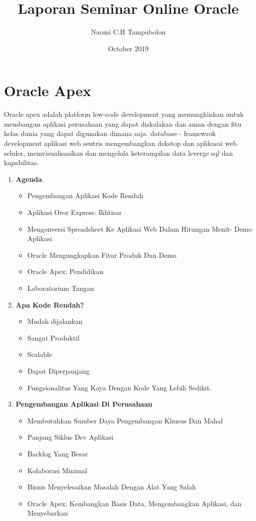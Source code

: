 \documentclass{article}
\title{Laporan Seminar Online Oracle}
\author{Naomi C.H Tampubolon }
\date{October 2019}
\begin{document}
\maketitle

\section{Oracle Apex}
Oracle apex adalah platform low-code development yang memungkinkan untuk membangun aplikasi perusahaan yang dapat diskalakan dan aman dengan fitu kelas dunia yang dapat digunakan dimana saja. database - framewrok development aplikasi web sentris mengembangkan dekstop dan aplikasai web seluler, memvisualisasikan dan mengelola keterampilan data leverge sql dan kapabilitas.\\

\begin{enumerate}
\item \textbf{Agenda}.
\begin{itemize}
\item Pengembangan Aplikasi Kode Rendah
\item Aplikasi Oror Express: Ikhtisar
\item Mengonversi Spreadsheet Ke Aplikasi Web Dalam Hitungan Menit- Demo Aplikasi
\item Oracle Mengungkapkan Fitur Produk Dan Demo
\item Oracle Apex: Pendidikan
\item Laboratorium Tangan\\

\end{itemize}
\item \textbf{Apa Kode Rendah?}
\begin{itemize}
\item Mudah dijalankan
\item Sangat Produktif
\item Scalable
\item Dapat Diperpanjang
\item Fungsionalitas Yang Kaya Dengan Kode Yang Lebih Sedikit.\\
\end{itemize}
\item \textbf{Pengembangan Aplikasi Di Perusahaan}
\begin{itemize}
\item  Membutuhkan Sumber Daya Pengembangan Khusus Dan Mahal
\item Panjang Siklus Dev Aplikasi
\item Backlog Yang Besar
\item Kolaborasi Minimal
\item Bisnis Menyelesaikan Masalah Dengan Alat Yang Salah
\item Oracle Apex: Kembangkan Basis Data, Mengembangkan Aplikasi, dan Menyebarkan\\


\end{itemize}
\end{enumerate}
\end{document}
